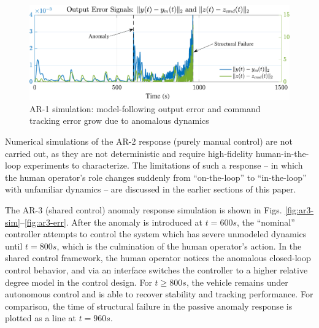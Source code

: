 \documentclass[english]{ifacconf}
\begin{document}
\begin{figure}[htbp]
	\centering
	\includegraphics[width=\columnwidth]{../fig/ar1-err.pdf}
	\caption{AR-1 simulation: model-following output error and command tracking error grow due to anomalous dynamics}
	\label{fig:ar1-err}
\end{figure}

Numerical simulations of the AR-2 response (purely manual control) are not carried out, as they are not deterministic and require high-fidelity human-in-the-loop experiments to characterize. The limitations of such a response -- in which the human operator's role changes suddenly from ``on-the-loop'' to ``in-the-loop'' with unfamiliar dynamics -- are discussed in the earlier sections of this paper.

The AR-3 (shared control) anomaly response simulation is shown in Figs. \ref{fig:ar3-sim}--\ref{fig:ar3-err}. After the anomaly is introduced at $t = 600 s$, the ``nominal'' controller attempts to control the system which has severe unmodeled dynamics until $t = 800 s$, which is the culmination of the human operator's action. In the shared control framework, the human operator notices the anomalous closed-loop control behavior, and via an interface switches the controller to a higher relative degree model in the control design. For $t \geq 800 s$, the vehicle remains under autonomous control and is able to recover stability and tracking performance. For comparison, the time of structural failure in the passive anomaly response is plotted as a line at $t = 960 s$.
\end{document}
